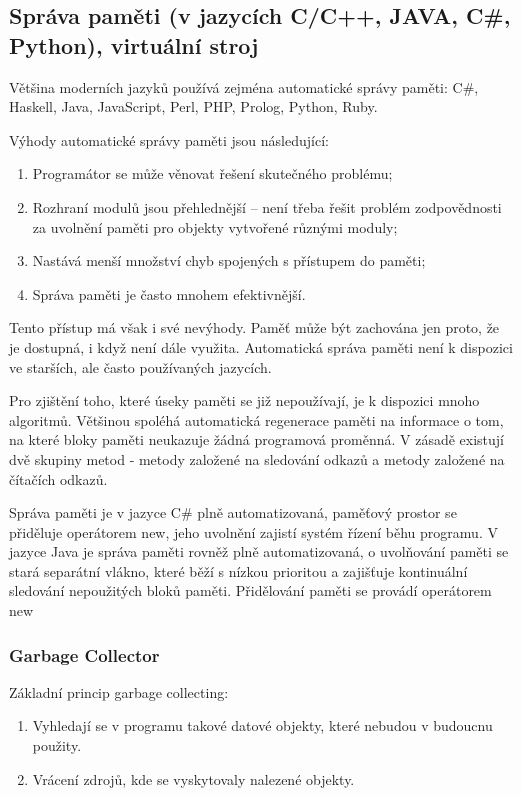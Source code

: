 \subsection{Správa paměti (v jazycích C/C++, JAVA, C\#, Python), virtuální stroj}
Většina moderních jazyků používá zejména automatické správy paměti: C\#, Haskell, Java, JavaScript, Perl, PHP, Prolog, Python, Ruby.

Výhody automatické správy paměti jsou následující:
\begin{enumerate}
\item Programátor se může věnovat řešení skutečného problému;
\item Rozhraní modulů jsou přehlednější -- není třeba řešit problém zodpovědnosti za uvolnění paměti pro objekty vytvořené různými moduly;
\item Nastává menší množství chyb spojených s přístupem do paměti;
\item Správa paměti je často mnohem efektivnější.
\end{enumerate}

Tento přístup má však i své nevýhody. Paměť může být zachována jen proto, že je dostupná, i když není dále využita. Automatická správa paměti není k dispozici ve starších, ale často používaných jazycích.

Pro zjištění toho, které úseky paměti se již nepoužívají, je k dispozici mnoho algoritmů. Většinou spoléhá automatická regenerace paměti na informace o tom, na které bloky paměti neukazuje žádná programová proměnná. V zásadě existují dvě skupiny metod - metody založené na sledování odkazů a metody založené na čítačích odkazů.

Správa paměti je v jazyce C\# plně automatizovaná, paměťový prostor se přiděluje operátorem new, jeho uvolnění zajistí systém řízení běhu programu. V jazyce Java je správa paměti rovněž plně automatizovaná, o uvolňování paměti se stará separátní vlákno, které běží s nízkou prioritou a zajišťuje kontinuální sledování nepoužitých bloků paměti. Přidělování paměti se provádí operátorem new

\subsubsection{Garbage Collector}
Základní princip garbage collecting:
\begin{enumerate}
\item Vyhledají se v programu takové datové objekty, které nebudou v budoucnu použity.
\item Vrácení zdrojů, kde se vyskytovaly nalezené objekty.
\end{enumerate}

